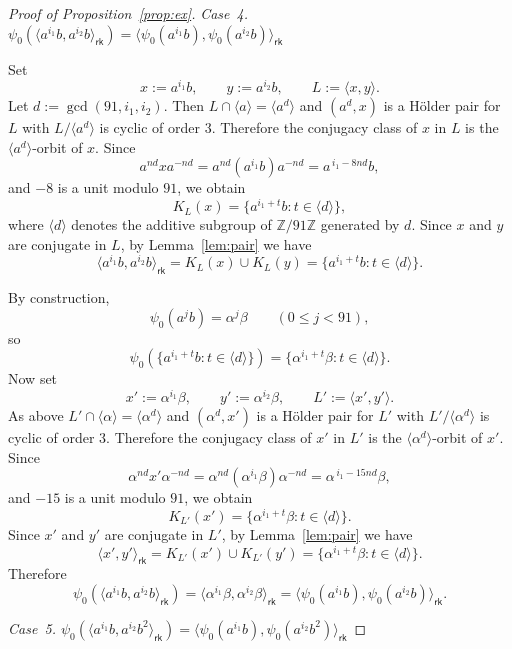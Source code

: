 \documentclass[10pt,a4paper]{amsart}
\begin{document}
\begin{proof}[Proof of Proposition~\ref{prop:ex}]
  
  
  \medskip
  \noindent
  \emph{Case~4.\; $\psi_0(\langle a^{i_1}b,a^{i_2}b\rangle_{\mathsf{rk}}) = \langle \psi_0(a^{i_1}b),\psi_0(a^{i_2}b)\rangle_{\mathsf{rk}}$}
  
  \medskip
  Set
  $$ x:=a^{i_1}b,\qquad y:=a^{i_2}b,\qquad L:=\langle x,y\rangle. $$
  Let $d:=\gcd(91,i_1,i_2)$. Then $L\cap \langle a\rangle = \langle a^d\rangle$ and $(a^d,x)$ is a Hölder pair for $L$ with $L/\langle a^d\rangle$ is cyclic of order $3$. Therefore the conjugacy class of $x$ in $L$ is the $\langle a^d\rangle$-orbit of $x$. Since
  $$ a^{nd}xa^{-nd}=a^{nd}(a^{i_1}b)a^{-nd}=a^{\,i_1-8nd}b, $$
  and $-8$ is a unit modulo $91$, we obtain
  $$ K_L(x)=\{a^{i_1+t}b : t\in \langle d\rangle\}, $$
  where $\langle d\rangle$ denotes the additive subgroup of $\mathbb{Z}/91\mathbb{Z}$ generated by $d$. Since $x$ and $y$ are conjugate in $L$, by Lemma~\ref{lem:pair} we have
  $$ \langle a^{i_1}b,a^{i_2}b\rangle_{\mathsf{rk}} = K_L(x)\cup K_L(y) = \{a^{i_1+t}b : t\in \langle d\rangle\}. $$
  
  By construction,
  $$ \psi_0(a^jb)=\alpha^j\beta \qquad (0\leq j<91), $$
  so
  $$ \psi_0(\{a^{i_1+t}b : t\in \langle d\rangle\}) = \{\alpha^{i_1+t}\beta : t\in \langle d\rangle\}. $$
  Now set
  $$ x':=\alpha^{i_1}\beta,\qquad y':=\alpha^{i_2}\beta,\qquad L':=\langle x',y'\rangle. $$
  As above $L'\cap \langle \alpha\rangle=\langle \alpha^d\rangle$ and $(\alpha^d,x')$ is a Hölder pair for $L'$ with $L'/\langle\alpha^d \rangle$ is cyclic of order $3$. Therefore the conjugacy class of $x'$ in $L'$ is the $\langle \alpha^d\rangle$-orbit of $x'$. Since
  $$ \alpha^{nd}x'\alpha^{-nd} = \alpha^{nd}(\alpha^{i_1}\beta)\alpha^{-nd} = \alpha^{\,i_1-15nd}\beta, $$
  and $-15$ is a unit modulo $91$, we obtain
  $$ K_{L'}(x')=\{\alpha^{i_1+t}\beta : t\in \langle d\rangle\}. $$
  Since $x'$ and $y'$ are conjugate in $L'$, by Lemma~\ref{lem:pair} we have 
  $$ \langle x',y'\rangle_{\mathsf{rk}} = K_{L'}(x')\cup K_{L'}(y') = \{\alpha^{i_1+t}\beta : t\in \langle d\rangle\}. $$
  Therefore
  $$ \psi_0(\langle a^{i_1}b,a^{i_2}b\rangle_{\mathsf{rk}}) = \langle \alpha^{i_1}\beta,\alpha^{i_2}\beta\rangle_{\mathsf{rk}} = \langle \psi_0(a^{i_1}b),\psi_0(a^{i_2}b)\rangle_{\mathsf{rk}}. $$
  
  
  \medskip
  \noindent
  \emph{Case~5.\; $\psi_0(\langle a^{i_1}b,a^{i_2}b^2\rangle_{\mathsf{rk}}) = \langle \psi_0(a^{i_1}b),\psi_0(a^{i_2}b^2)\rangle_{\mathsf{rk}}$}
  

\end{proof}
\end{document}

